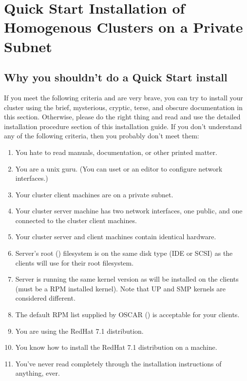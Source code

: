 %
%
%

\begchange
\section{Quick Start Installation of Homogenous Clusters on a Private Subnet}


\subsection{Why you shouldn't do a Quick Start install}

If you meet the following criteria and are very brave, you can 
try to install your cluster using the brief, mysterious,
cryptic, terse, and obscure documentation in this section.  
Otherwise, please do the right thing and read and use the 
detailed installation procedure section of this installation guide.
If you don't understand any of the following criteria, 
then you probably don't meet them:

\begin{enumerate}
\item You hate to read manuals, documentation, or other printed matter.
\item You are a unix guru. (You can uset  or an editor to
  configure network interfaces.)
\item Your cluster client machines are on a private subnet.
\item Your cluster server machine has two network interfaces, one public,
  and one connected to the cluster client machines.
\item Your cluster server and client machines contain identical hardware.
\item Server's root (\file{/}) filesystem is on the same disk type (IDE
  or SCSI) as the clients will use for their root filesystem.
\item Server is running the same kernel version as will be installed
  on the clients (must be a RPM installed kernel). Note that UP and
  SMP kernels are considered different.
\item The default RPM list supplied by OSCAR
  () is
  acceptable for your clients.
\item You are using the RedHat 7.1 distribution.
\item You know how to install the RedHat 7.1 distribution on a machine.
\item You've never read completely through the installation instructions
  of anything, ever. 
\end{enumerate}

